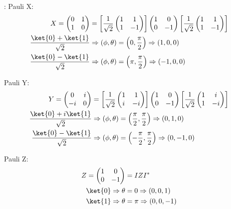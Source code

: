 \par {}:
%
Pauli X:
\begin{align*}
X = \begin{pmatrix} 0 & 1 \\ 1 & 0 \end{pmatrix}
&=
\left[ \frac{1}{\sqrt{2}} \begin{pmatrix} 1 & 1 \\ 1 & -1 \end{pmatrix} \right]
\begin{pmatrix} 1 & 0 \\ 0 & -1 \end{pmatrix}
\left[ \frac{1}{\sqrt{2}} \begin{pmatrix} 1 & 1 \\ 1 & -1 \end{pmatrix} \right] \\
\frac{\ket{0} + \ket{1}}{\sqrt{2}} &\Rightarrow \left( \phi, \theta \right) = \left( 0, \frac{\pi}{2} \right) \Rightarrow \left( 1, 0, 0 \right) \\
\frac{\ket{0} - \ket{1}}{\sqrt{2}} &\Rightarrow \left( \phi, \theta \right) = \left( \pi, \frac{\pi}{2} \right) \Rightarrow \left( -1, 0, 0 \right)
\end{align*}
%
\par Pauli Y:
%
\begin{align*}
Y = \begin{pmatrix} 0 & i \\ -i & 0 \end{pmatrix}
&=
\left[ \frac{1}{\sqrt{2}} \begin{pmatrix} 1 & 1 \\ i & -i \end{pmatrix} \right]
\begin{pmatrix} 1 & 0 \\ 0 & -1 \end{pmatrix}
\left[ \frac{1}{\sqrt{2}} \begin{pmatrix} 1 & i \\ 1 & -i \end{pmatrix} \right] \\
\frac{\ket{0} + i \ket{1}}{\sqrt{2}} &\Rightarrow \left( \phi, \theta \right) = \left( \frac{\pi}{2}, \frac{\pi}{2} \right) \Rightarrow \left( 0, 1, 0 \right) \\
\frac{\ket{0} - \ket{1}}{\sqrt{2}} &\Rightarrow \left( \phi, \theta \right) = \left( -\frac{\pi}{2}, \frac{\pi}{2} \right) \Rightarrow \left( 0, -1, 0 \right)
\end{align*}
%
\par Pauli Z:
%
\begin{align*}
Z = \begin{pmatrix} 1 & 0 \\ 0 & -1 \end{pmatrix} &= I Z I^* \\
\ket{0} \Rightarrow \theta &= 0 \Rightarrow \left( 0, 0, 1 \right) \\
\ket{1} \Rightarrow \theta &= \pi \Rightarrow \left( 0, 0, -1 \right)
\end{align*}
